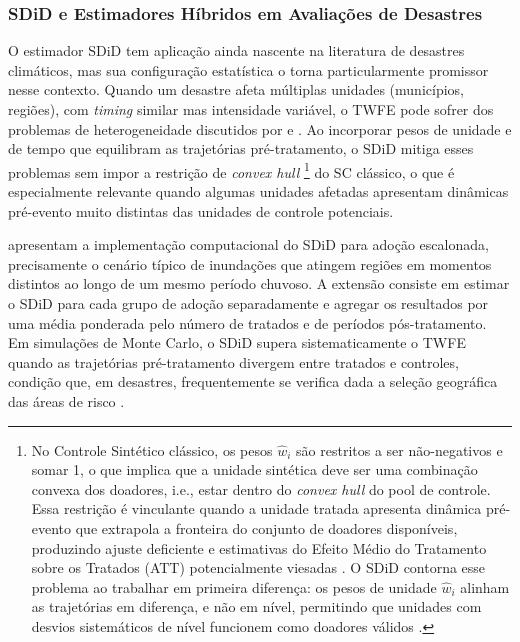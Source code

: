 \documentclass[a4paper,12pt]{article}
\begin{document}
\subsubsection{SDiD e Estimadores Híbridos em Avaliações de Desastres}

O estimador SDiD \cite{arkhangelsky2021} tem aplicação ainda nascente na literatura de
desastres climáticos, mas sua configuração estatística o torna particularmente promissor
nesse contexto. Quando um desastre afeta múltiplas unidades (municípios, regiões), com
\textit{timing} similar mas intensidade variável, o TWFE pode sofrer dos problemas de
heterogeneidade discutidos por  e
. Ao incorporar pesos de unidade e de tempo que
equilibram as trajetórias pré-tratamento, o SDiD mitiga esses problemas sem impor a
restrição de \textit{convex hull}%
\footnote{No Controle Sintético clássico, os pesos $\hat{w}_i$ são restritos a ser
não-negativos e somar 1, o que implica que a unidade sintética deve ser uma
combinação convexa dos doadores, i.e., estar dentro do \textit{convex hull} do
pool de controle. Essa restrição é vinculante quando a unidade tratada apresenta
dinâmica pré-evento que extrapola a fronteira do conjunto de doadores disponíveis,
produzindo ajuste deficiente e estimativas do Efeito Médio do Tratamento sobre os
Tratados (ATT) potencialmente viesadas \cite{abadie2021}. O SDiD contorna esse
problema ao trabalhar em primeira diferença:
os pesos de unidade $\hat{w}_i$ alinham as trajetórias em diferença, e não em nível,
permitindo que unidades com desvios sistemáticos de nível funcionem como doadores
válidos \cite{arkhangelsky2021}.}
do SC clássico, o que é especialmente relevante quando
algumas unidades afetadas apresentam dinâmicas pré-evento muito distintas das unidades
de controle potenciais.

 apresentam a implementação computacional do SDiD para
adoção escalonada, precisamente o cenário típico de inundações que atingem regiões em
momentos distintos ao longo de um mesmo período chuvoso. A extensão consiste em
estimar o SDiD para cada grupo de adoção separadamente e agregar os resultados por
uma média ponderada pelo número de tratados e de períodos pós-tratamento. Em
simulações de Monte Carlo, o SDiD supera sistematicamente o TWFE quando as
trajetórias pré-tratamento divergem entre tratados e controles, condição que, em
desastres, frequentemente se verifica dada a seleção geográfica das áreas de risco
\cite{arkhangelsky2021}.
\end{document}
